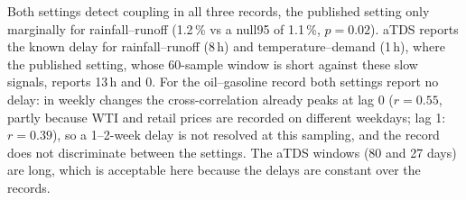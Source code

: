 \documentclass[11pt,a4paper]{article}
\begin{document}
\begin{table}[t]
\centering
\caption{Records from other fields. Score vs the 95th percentile of 200 rotated copies (null95); delay = most frequent $\tau_0$ among stable windows, signed so that the driver (rain, temperature, crude oil) leads.}
\label{tab:fields}
\footnotesize
{}
\end{table}

Both settings detect coupling in all three records, the published setting only marginally for rainfall--runoff (1.2\,\% vs a null95 of 1.1\,\%, $p = 0.02$). aTDS reports the known delay for rainfall--runoff (8\,h) and temperature--demand (1\,h), where the published setting, whose 60-sample window is short against these slow signals, reports 13\,h and 0. For the oil--gasoline record both settings report no delay: in weekly changes the cross-correlation already peaks at lag 0 ($r = 0.55$, partly because WTI and retail prices are recorded on different weekdays; lag 1: $r = 0.39$), so a 1--2-week delay is not resolved at this sampling, and the record does not discriminate between the settings. The aTDS windows (80 and 27 days) are long, which is acceptable here because the delays are constant over the records.

\end{document}
